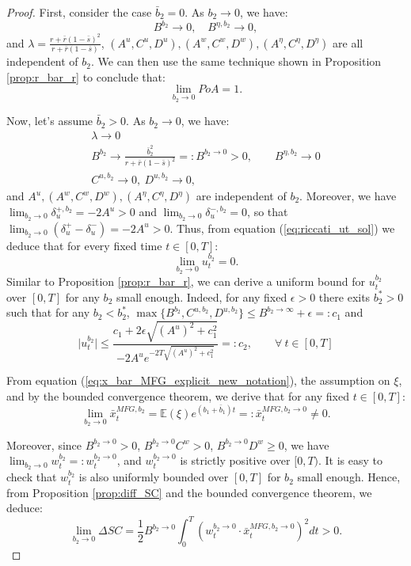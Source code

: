 \documentclass[11pt]{article}
\begin{document}
\begin{proof}
	First, consider the case $\bar{b}_2 =0$. As $b_2 \to 0$, we have:
	\begin{equation*}
		B^{b_2} \to 0, \quad B^{\eta,b_2} \to 0,
	\end{equation*}
	and $\lambda = \frac{r + \bar{r}(1- \bar{s})^2}{r + \bar{r}(1-\bar{s})}$, $(A^{u},C^{u}, D^{u}), (A^{w}, C^{w}, D^{w}), (A^\eta, C^\eta, D^\eta)$ are all independent of $b_2$. We can then use the same technique shown in Proposition \ref{prop:r_bar_r} to conclude that:
	$$\lim_{b_2 \to 0} PoA = 1.$$ 
	
	Now, let's assume $\bar{b}_2 > 0$.	As $b_2 \to 0$, we have:
	\begin{equation*}
	\begin{array}{l}
		\lambda \longrightarrow 0\\
		\displaystyle B^{b_2} \longrightarrow{}  \frac{\bar{b}_2^2}{r + \bar{r}(1-\bar{s})^2}=:B^{b_2 \to 0} >0, \qquad B^{\eta,b_2} \longrightarrow{} 0 \\
		C^{u,b_2} \longrightarrow{} 0, \  D^{u,b_2} \longrightarrow{} 0,
	\end{array}
	\end{equation*}
	and $A^u, (A^w, C^w, D^w), (A^\eta, C^\eta, D^\eta)$ are independent of $b_2$.
	Moreover, we have $\lim_{b_2 \to 0}\delta^{+,b_2}_u =-2A^u >0 $ and $\lim_{b_2 \to 0}\delta^{-,b_2}_u = 0$, so that $\lim_{b_2 \to 0}(\delta^{+}_u - \delta^{-}_u) = -2 A^u > 0$. Thus, from equation (\ref{eq:riccati_ut_sol}) we deduce that for every fixed time $t \in [0,T]$:
	$$\lim_{b_2 \to 0}u^{b_2}_t = 0 .$$
	Similar to Proposition \ref{prop:r_bar_r}, we can derive a uniform bound for $u_t^{b_2}$ over $[0,T]$ for any $b_2$ small enough. Indeed, for any fixed $\epsilon >0$ there exits $b_2^* >0$ such that for any $b_2 < b_2^*$, $\max \{B^{b_2}, C^{u,b_2}, D^{u,b_2} \} \leq B^{b_2 \to \infty} + \epsilon =: c_1$ and
	\begin{equation*}
	 \vert u_t^{b_2} \vert \leq \frac{c_1 + 2 \epsilon \sqrt{(A^u)^2 + c_1^2} }{- 2 A^u e^{-2T \sqrt{(A^u)^2 + c_1^2} } } =: c_2 ,\qquad \forall  \  t \in [0,T]
	\end{equation*}
	
	From equation (\ref{eq:x_bar_MFG_explicit_new_notation}), the assumption on $\xi$, and by the bounded convergence theorem, we derive that for any fixed $t \in [0,T]$:
	$$\lim_{b_2 \to 0} \bar{x}_t^{MFG,b_2} = \mathbb{E}(\xi) e^{(b_1+\bar{b}_1)t} =: \bar{x}_t^{MFG,b_2 \to 0} \neq 0.$$
	
	
	Moreover, since $B^{b_2 \to 0}>0$, $B^{b_2 \to 0}C^w >0$, $B^{b_2\to 0}D^w \geq 0$, we have $\lim_{b_2 \to 0} w_t^{b_2}=:w_t^{b_2 \to 0}$, and $w_t^{b_2 \to 0}$ is strictly positive over $[0,T)$. It is easy to check that $w_t^{b_2}$ is also uniformly bounded over $[0,T]$ for $b_2$ small enough. Hence, from Proposition \ref{prop:diff_SC} and the bounded convergence theorem, we deduce:
	\begin{equation*}
	\lim_{b_2 \to 0} \Delta SC = \frac{1}{2} B^{b_2\to 0} \int_0^T (w_t^{b_2 \to 0} \cdot \bar{x}_t^{MFG,b_2 \to 0})^2 dt >0.
	\end{equation*}
	

\end{proof}
\end{document}
